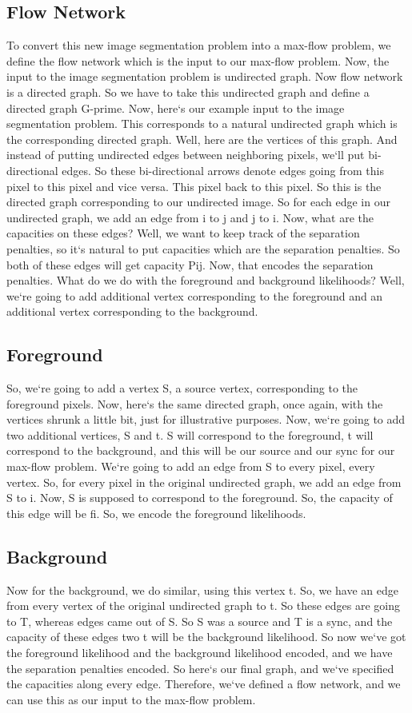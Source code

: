 \subsection{Flow Network}
To convert this new image segmentation problem into a max-flow problem, we define the flow network which is the input to our max-flow problem.
Now, the input to the image segmentation problem is undirected graph.
Now flow network is a directed graph.
So we have to take this undirected graph and define a directed graph G-prime.
Now, here`s our example input to the image segmentation problem.
This corresponds to a natural undirected graph which is the corresponding directed graph.
Well, here are the vertices of this graph.
And instead of putting undirected edges between neighboring pixels, we`ll put bi-directional edges.
So these bi-directional arrows denote edges going from this pixel to this pixel and vice versa.
This pixel back to this pixel.
So this is the directed graph corresponding to our undirected image.
So for each edge in our undirected graph, we add an edge from i to j and j to i.
Now, what are the capacities on these edges? Well, we want to keep track of the separation penalties, so it`s natural to put capacities which are the separation penalties.
So both of these edges will get capacity Pij.
Now, that encodes the separation penalties.
What do we do with the foreground and background likelihoods? Well, we`re going to add additional vertex corresponding to the foreground and an additional vertex corresponding to the background.

\subsection{Foreground}
So, we`re going to add a vertex S, a source vertex, corresponding to the foreground pixels.
Now, here`s the same directed graph, once again, with the vertices shrunk a little bit, just for illustrative purposes.
Now, we`re going to add two additional vertices, S and t.
S will correspond to the foreground, t will correspond to the background, and this will be our source and our sync for our max-flow problem.
We`re going to add an edge from S to every pixel, every vertex.
So, for every pixel in the original undirected graph, we add an edge from S to i.
Now, S is supposed to correspond to the foreground.
So, the capacity of this edge will be fi.
So, we encode the foreground likelihoods.

\subsection{Background}
Now for the background, we do similar, using this vertex t.
So, we have an edge from every vertex of the original undirected graph to t.
So these edges are going to T, whereas edges came out of S\@.
So S was a source and T is a sync, and the capacity of these edges two t will be the background likelihood.
So now we`ve got the foreground likelihood and the background likelihood encoded, and we have the separation penalties encoded.
So here`s our final graph, and we`ve specified the capacities along every edge.
Therefore, we`ve defined a flow network, and we can use this as our input to the max-flow problem.

